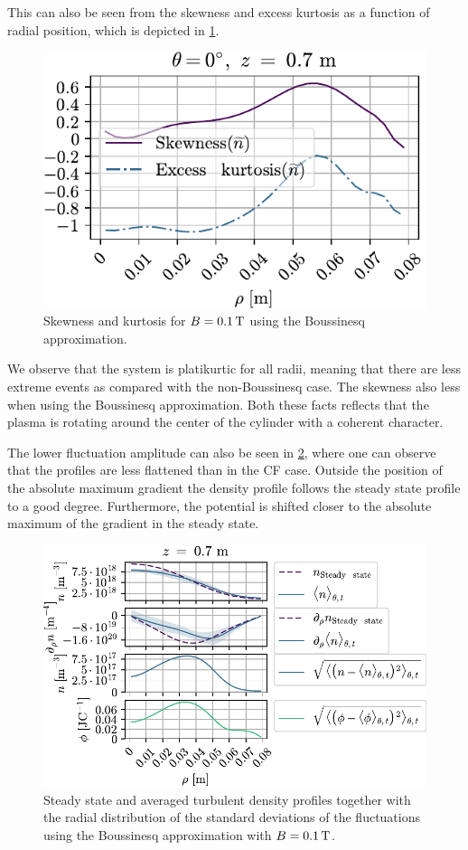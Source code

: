 This can also be seen from the skewness and excess kurtosis as a function of radial position, which is depicted in \cref{fig:skewKurt008B}.
%
\begin{figure}[htb]
    \centering
    \includegraphics{fig/results/compareBouss/skewKurt008B}
    \caption{Skewness and kurtosis for $B=0.1\, \text{T}$ using the Boussinesq approximation.}
    \label{fig:skewKurt008B}
\end{figure}
%
We observe that the system is platikurtic for all radii, meaning that there are less extreme events as compared with the non-Boussinesq case.
The skewness also less when using the Boussinesq approximation.
Both these facts reflects that the plasma is rotating around the center of the cylinder with a coherent character.

The lower fluctuation amplitude can also be seen in \cref{fig:fluctProfiles01B}, where one can observe that the profiles are less flattened than in the CF case.
Outside the position of the absolute maximum gradient the density profile follows the steady state profile to a good degree.
Furthermore, the potential is shifted closer to the absolute maximum of the gradient in the steady state.
%
\begin{figure}[htb]
    \centering
    \includegraphics{fig/results/compareBouss/fluctProfiles01B}
    \caption{Steady state and averaged turbulent density profiles together with the radial distribution of the standard deviations of the fluctuations using the Boussinesq approximation with $B=0.1\, \text{T}$.}
    \label{fig:fluctProfiles01B}
\end{figure}
%
